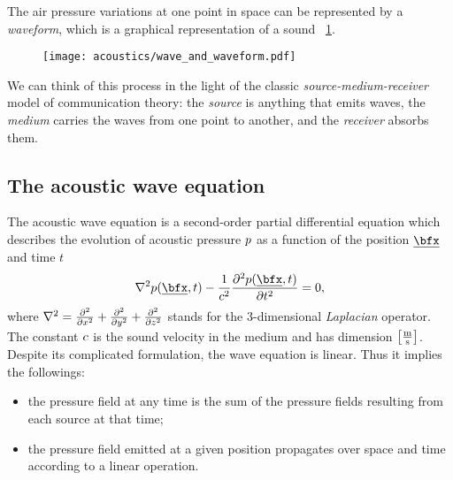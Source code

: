 The air pressure variations at one point in space can be represented by a \textit{waveform}, which is a graphical representation of a sound
~\cref{fig:acoustics:acoustics_wave}.

\begin{figure}[h]
    \centering
    \texttt{[image: acoustics/wave\_and\_waveform.pdf]}
    \label{fig:acoustics:acoustics_wave}
\end{figure}

We can think of this process in the light of the classic \textit{source-medium-receiver} model of communication theory:
the \textit{source} is anything that emits waves, the \textit{medium} carries the waves from one point to another, and the \textit{receiver} absorbs them.

\subsection{The acoustic wave equation}\label{subsec:acoustics:waveq}
The acoustic wave equation is a second-order partial differential equation which describes the evolution of acoustic pressure $\pressure$
as a function of the position $\positionMicrophone$ and time $t$
\begin{equation}
    \label{eq:acoustics:wave}
    \knabla^2 \pressureSpaceTime - \frac{1}{\speedOfSound^2} \kpderiv[2]{\pressureSpaceTime}{t} = 0
    ,
\end{equation}
where $\knabla^2 = \kpderiv[2]{}{x} + \kpderiv[2]{}{y} + \kpderiv[2]{}{z}$ stands for the 3-dimensional \textit{Laplacian} operator.
The constant $\speedOfSound$ is the sound velocity in the medium and has dimension $\kbracket{\frac{\si{\metre}}{\si{\second}}}$.
\\Despite its complicated formulation, the wave equation is linear. Thus it implies the followings:
\begin{itemize}
    \item the pressure field at any time is the sum of the pressure fields resulting from each source at that time;
    \item the pressure field emitted at a given position propagates over space and time according to a linear operation.
\end{itemize}

